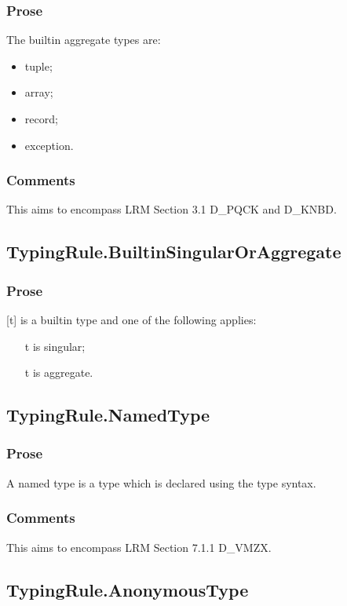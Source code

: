 \documentclass{book}
\begin{document}
    \subsubsection{Prose}
    The builtin aggregate types are:
    \begin{itemize}
    \item  tuple;
    \item  array;
    \item  record;
    \item  exception.
    \end{itemize}

    \subsubsection{Comments}
    This aims to encompass LRM Section 3.1 D\_PQCK and D\_KNBD.

\subsection{TypingRule.BuiltinSingularOrAggregate}

    \subsubsection{Prose}
    [t] is a builtin type and one of the following applies:
    \begin{itemize}
    \item  [t] is singular;
    \item  [t] is aggregate.
    \end{itemize}

\subsection{TypingRule.NamedType} 

    \subsubsection{Prose}
    A named type is a type which is declared using the type syntax.

    \subsubsection{Comments}
    This aims to encompass LRM Section 7.1.1 D\_VMZX.

\subsection{TypingRule.AnonymousType}
\end{document}
